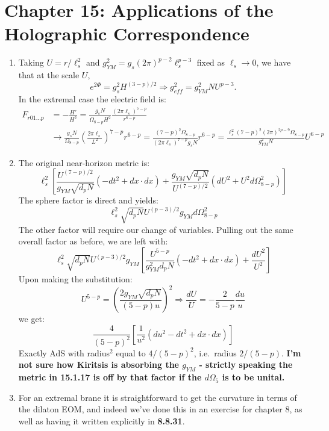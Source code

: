 \documentclass[11pt, class=article, crop=false]{standalone}
\begin{document}
\section{Chapter 15: Applications of the Holographic Correspondence} %
\label{sec:chapter_15_applications_of_the_holographic_correspondence}
\begin{enumerate}
	\item Taking $U = r/\ell_s^2$ and $g_{YM}^2 = g_s (2\pi)^{p-2} \ell_s^{p-3}$ fixed as $\ell_s \to 0$, we have that at the scale $U$,
	\[
		e^{2 \Phi} = g_s^2 H^{(3-p)/2} \Rightarrow g_{eff}^2 = g_{YM}^2 N U^{p-3}.
	\]
	In the extremal case the electric field is:
	\[
	\begin{aligned}
		F_{r01\dots p} &= - \frac{H'}{H^2} = \frac{g_s N}{\Omega_{8-p} H^2} \frac{(2\pi \ell_s)^{7-p}}{r^{8-p}}\\& \to \frac{g_s N}{\Omega_{8-p}} \left(\frac{2 \pi \ell_s}{L^2} \right)^{7-p} r^{6-p} = \frac{(7-p)^2 \Omega_{8-p}}{(2 \pi \ell_s)^{7-p} g_s N} r^{6-p} = \frac{\ell_s^2 (7-p)^2 (2\pi)^{2p - 9} \Omega_{8-p}}{g_{YM}^2 N} U^{6-p}
	\end{aligned}
	\]
	
	\item The original near-horizon metric is:
	\[
		\ell_s^2 \left[\frac{U^{(7-p)/2}}{g_{YM} \sqrt{d_p N}} (-dt^2 + dx \cdot dx) + \frac{g_{YM} \sqrt{d_p N}}{U^{(7-p)/2}} (dU^2 + U^2 d\Omega_{8-p}^2)  \right]
	\]
	The sphere factor is direct and yields:
	\[
		\ell_s^2 \sqrt{d_p N} U^{(p-3)/2} g_{YM} d\Omega_{8-p}^2
	\]
	The other factor will require our change of variables. Pulling out the same overall factor as before, we are left with:
	\[
		\ell_s^2 \sqrt{d_p N} U^{(p-3)/2} g_{YM} \left[\frac{U^{5-p}}{g_{YM}^2 d_p N} (-dt^2 + dx \cdot dx) + \frac{dU^2}{U^2} \right]
	\]
	Upon making the substitution:
	\[
		U^{5-p} = \left(\frac{2 g_{YM} \sqrt{d_p N}}{(5-p) u} \right)^2 \Rightarrow \frac{dU}{U} = - \frac{2}{5-p} \frac{du}{u}
	\]
	we get:
	\[
		\frac{4}{(5-p)^2} \left[\frac{1}{u^2} (du^2 -dt^2 + dx \cdot dx)\right]
	\]
	Exactly AdS with radius$^2$ equal to $4/(5-p)^2$, i.e.\ radius $2/(5-p)$. \textbf{I'm not sure how Kiritsis is absorbing the $g_{YM}$ - strictly speaking the metric in 15.1.17 is off by that factor if the $d\Omega_5$ is to be unital.}
	
	\item For an extremal brane it is straightforward to get the curvature in terms of the dilaton EOM, and indeed we've done this in an exercise for chapter 8, as well as having it written explicitly in \textbf{8.8.31}. 
	

\end{enumerate}
\end{document}
